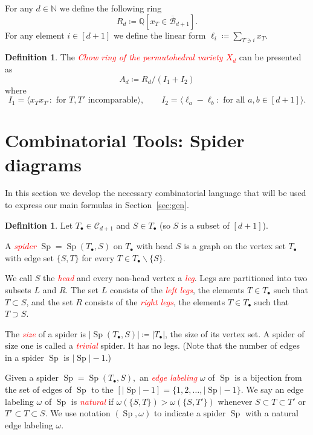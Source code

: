 \documentclass[10pt,a4paper]{amsart}
\theoremstyle{definition}
\newtheorem{defi}[thm]{Definition}
\newcommand{\important}[1]{\emph{\textcolor{red}{#1}}}
\DeclareMathOperator{\Sp}{Sp}
\newcommand{\hB}{\overline{\mathcal B}}
\newcommand{\CC}{\mathcal{C}}
\newcommand{\NN}{{\mathbb{N}}}
\begin{document}
For any $d\in \NN$ we define the following ring \[R_d\coloneqq \mathbb{Q}[ x_T \in \hB_{d+1}].\] 
For any element $i\in[d+1]$ we define the linear form $\ell_i\coloneqq \sum_{T \ni i} x_T$. 
\begin{defi}
	
	The \important{Chow ring of the permutohedral variety $X_d$} can be presented as
	\begin{equation}\label{eq:Chowdef}
	A_d \coloneqq R_d/(I_1+I_2)
	\end{equation}
	where
	\[
	I_1 = \langle x_Tx_{T'}: \text{ for $T,T'$ incomparable}\rangle,\qquad I_2 = \langle \ell_a-\ell_b:\text{ for all $a,b\in [d+1]$} \rangle.
	\]
\end{defi}

\section{Combinatorial Tools: Spider diagrams}\label{sec:spider}


In this section we develop the necessary combinatorial language that will be used to express our main formulas in Section~\ref{sec:gen}.

\begin{defi}
	Let $T_\bullet\in\CC_{d+1}$ and $S\in T_\bullet$ (so $S$ is a subset of $[d+1]$). 
	
	A \important{spider} $\Sp = \Sp(T_\bullet, S)$ on $T_\bullet$ with head $S$ is a graph on the vertex set $T_\bullet$ with edge set $\{S,T\}$ for every $T\in T_\bullet\backslash\{S\}$.
	
	We call $S$ the \important{head} and every non-head vertex a \important{leg}. Legs are partitioned into two subsets $L$ and $R$. The set $L$ consists of the \important{left legs}, the elements $T\in T_\bullet$ such that $T\subset S$, and the set $R$ consists of the \important{right legs}, the elements $T\in T_\bullet$ such that $T\supset S$.
	
	The \important{size} of a spider is $|\Sp(T_\bullet,S)|\coloneqq |T_\bullet|$, the size of its vertex set. A spider of size one is called a \important{trivial} spider. It has no legs. (Note that the number of edges in a spider $\Sp$ is $|\Sp|-1.$)
\end{defi}

Given a spider $\Sp=\Sp(T_\bullet, S),$ an \important{edge labeling} $\omega$ of $\Sp$ is a bijection from the set of edges of $\Sp$ to the $[|\Sp|-1] =\{1, 2, \dots, |\Sp|-1\}.$ We say an edge labeling $\omega$ of $\Sp$ is \important{natural} if $\omega(\{S,T\})>\omega(\{S,T'\})$ whenever $S\subset T\subset T'$ or $T'\subset T\subset S$. We use notation $(\Sp, \omega)$ to indicate a spider $\Sp$ with a natural edge labeling $\omega$. 
\end{document}
